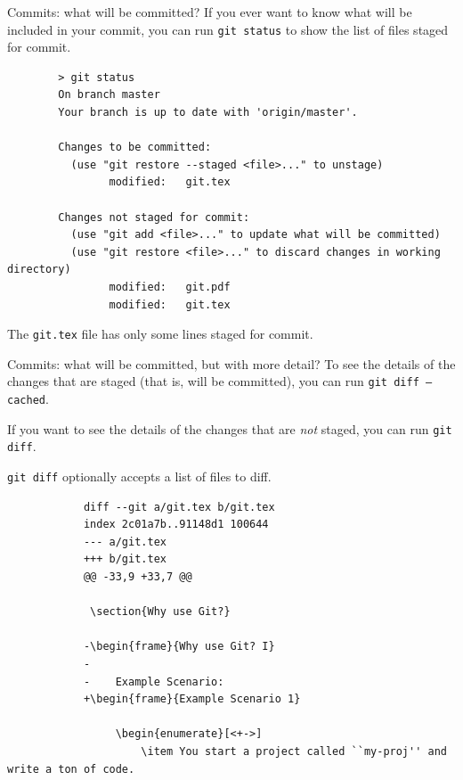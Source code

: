 \documentclass{beeper}
\begin{document}
\begin{frame}[fragile]{Commits: what will be committed?}
    If you ever want to know what will be included in your commit, you can run
    \texttt{git status} to show the list of files staged for commit.
    \pause

    {
        \tiny
        \begin{verbatim}
        > git status
        On branch master
        Your branch is up to date with 'origin/master'.

        Changes to be committed:
          (use "git restore --staged <file>..." to unstage)
                modified:   git.tex

        Changes not staged for commit:
          (use "git add <file>..." to update what will be committed)
          (use "git restore <file>..." to discard changes in working directory)
                modified:   git.pdf
                modified:   git.tex
        \end{verbatim}
    }

    \pause
    The \texttt{git.tex} file has only some lines staged for commit.
\end{frame}

\begin{frame}[fragile]{Commits: what will be committed, but with more detail?}
    To see the details of the changes that are staged (that is, will be
    committed), you can run \texttt{git diff --cached}.

    If you want to see the details of the changes that are \textit{not} staged,
    you can run \texttt{git diff}.

    \texttt{git diff} optionally accepts a list of files to diff.
    \pause

    {
        \tiny
        \begin{verbatim}
            diff --git a/git.tex b/git.tex
            index 2c01a7b..91148d1 100644
            --- a/git.tex
            +++ b/git.tex
            @@ -33,9 +33,7 @@

             \section{Why use Git?}

            -\begin{frame}{Why use Git? I}
            -
            -    Example Scenario:
            +\begin{frame}{Example Scenario 1}

                 \begin{enumerate}[<+->]
                     \item You start a project called ``my-proj'' and write a ton of code.
        \end{verbatim}
    }
\end{frame}
\end{document}
